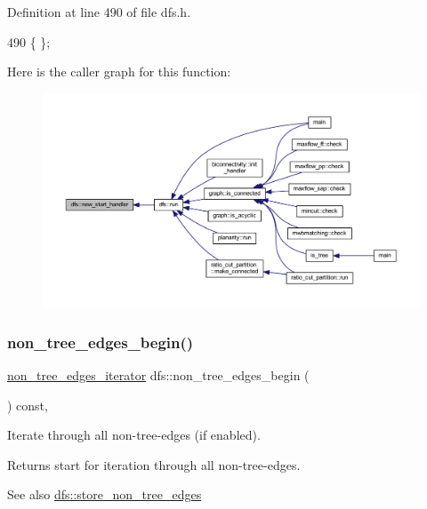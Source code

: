 Definition at line 490 of file dfs.\+h.


\begin{DoxyCode}
490 \{ \};
\end{DoxyCode}
Here is the caller graph for this function\+:
\nopagebreak
\begin{figure}[H]
\begin{center}
\leavevmode
\includegraphics[width=350pt]{classdfs_a304b14458fb78f9feb3d8d5683d3cab5_icgraph}
\end{center}
\end{figure}
\mbox{\label{classdfs_a4efe5bb72d00305e6b226e67c2b2ef6e}} 
\subsubsection{\texorpdfstring{non\+\_\+tree\+\_\+edges\+\_\+begin()}{non\_tree\_edges\_begin()}}
{\footnotesize\ttfamily \mbox{\hyperlink{classdfs_a95e353f354d3b31daded0c4fe749171a}{non\+\_\+tree\+\_\+edges\+\_\+iterator}} dfs\+::non\+\_\+tree\+\_\+edges\+\_\+begin (\begin{DoxyParamCaption}{ }\end{DoxyParamCaption}) const\hspace{0.3cm}{\ttfamily [inline]}, {\ttfamily [inherited]}}



Iterate through all non-\/tree-\/edges (if enabled). 

\begin{DoxyReturn}{Returns}
start for iteration through all non-\/tree-\/edges. 
\end{DoxyReturn}
\begin{DoxySeeAlso}{See also}
\mbox{\hyperlink{classdfs_a6f54f1c4339eacc8961e795439d4593d}{dfs\+::store\+\_\+non\+\_\+tree\+\_\+edges}} 
\end{DoxySeeAlso}


